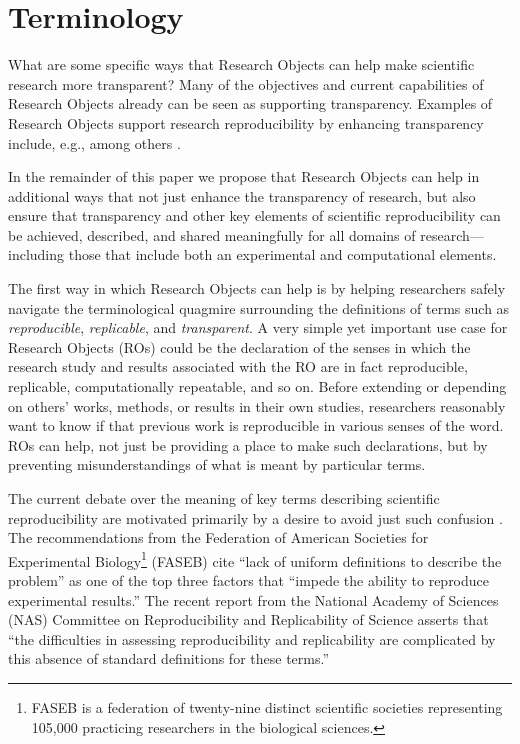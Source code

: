 \section{Terminology}\label{sec-terminology}

What are some specific ways that Research Objects \cite{bechhofer2013whya} can help 
	make scientific research more transparent?  
Many of the objectives and current capabilities of Research Objects already can be seen as supporting
	transparency.
Examples of Research Objects support research reproducibility by enhancing transparency include, e.g., 
	\cite{mecum2018preservingc} among others \cite{DBLP:conf/eScience/2018}. 


In the remainder of this paper we propose that Research Objects can help in additional ways that not
	just enhance the transparency of research, but also ensure that transparency and other key elements
	of scientific reproducibility can be achieved, described, and shared meaningfully for all domains
	of research---including those that include both an experimental and computational elements.

The first way in which Research Objects can help is by helping researchers safely navigate the 
	terminological quagmire surrounding the definitions of terms such as \emph{reproducible},
	\emph{replicable}, and \emph{transparent}.
A very simple yet important use case for Research Objects (ROs) could be the declaration of the senses in
	which the research study and results associated with the RO are in fact reproducible, replicable,
	computationally repeatable, and so on.
Before extending or depending on others' works, methods, or results in their own studies, researchers
	reasonably want to know if that previous work is reproducible in various senses of the word.
ROs can help, not just be providing a place to make such declarations, but by preventing
	misunderstandings of what is meant by particular terms.

The current debate over the meaning of key terms describing 
	scientific reproducibility are motivated primarily by a desire to avoid just such confusion \cite{drummond2009replicability,goodman2016what,rauber16primad,herouxtoward,plesser2018reproducibility,barba2018terminologies,committeeonreproducibilityandreplicabilityinscience2019reproducibility}.
The recommendations from the Federation of
	American Societies for Experimental Biology\footnote{FASEB is a federation of twenty-nine distinct scientific societies representing 105,000 
	practicing researchers in the biological sciences.} 
	(FASEB) 
	\cite{FASEB2016enhancing} cite ``lack of uniform definitions to describe the problem''
	as one of the top three factors that ``impede the ability to reproduce experimental results.''
 The recent report from the National Academy of Sciences (NAS) Committee on Reproducibility and Replicability of Science \cite{committeeonreproducibilityandreplicabilityinscience2019reproducibility} asserts
	that ``the difficulties in assessing reproducibility and replicability are complicated by this absence of
	standard definitions for these terms.''

